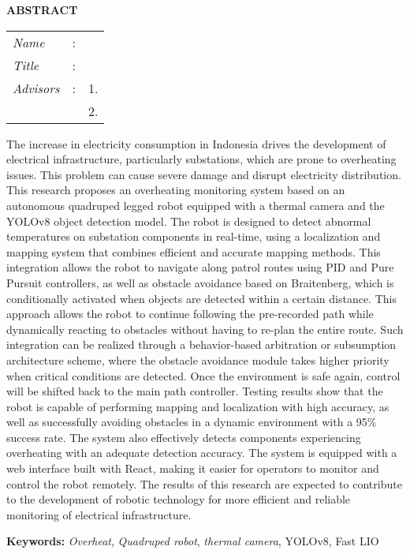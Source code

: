 \begin{center}
  \large\textbf{ABSTRACT}
\end{center}


\vspace{2ex}

\begingroup
\setlength{\tabcolsep}{0pt}

\noindent
\begin{tabularx}{\textwidth}{l >{\centering}m{3em} X}
  \emph{Name}     & : & \name{}         \\

  \emph{Title}    & : & \engtatitle{}   \\

  \emph{Advisors} & : & 1. \advisor{}   \\
                  &   & 2. \coadvisor{} \\
\end{tabularx}
\endgroup

The increase in electricity consumption in Indonesia drives the development of electrical infrastructure, particularly substations, which are prone to overheating issues. This problem can cause severe damage and disrupt electricity distribution. This research proposes an overheating monitoring system based on an autonomous quadruped legged robot equipped with a thermal camera and the YOLOv8 object detection model. The robot is designed to detect abnormal temperatures on substation components in real-time, using a localization and mapping system that combines efficient and accurate mapping methods. This integration allows the robot to navigate along patrol routes using PID and Pure Pursuit controllers, as well as obstacle avoidance based on Braitenberg, which is conditionally activated when objects are detected within a certain distance. This approach allows the robot to continue following the pre-recorded path while dynamically reacting to obstacles without having to re-plan the entire route. Such integration can be realized through a behavior-based arbitration or subsumption architecture scheme, where the obstacle avoidance module takes higher priority when critical conditions are detected. Once the environment is safe again, control will be shifted back to the main path controller. Testing results show that the robot is capable of performing mapping and localization with high accuracy, as well as successfully avoiding obstacles in a dynamic environment with a 95\% success rate. The system also effectively detects components experiencing overheating with an adequate detection accuracy. The system is equipped with a web interface built with React, making it easier for operators to monitor and control the robot remotely. The results of this research are expected to contribute to the development of robotic technology for more efficient and reliable monitoring of electrical infrastructure.

\vspace{2ex}
\noindent
\textbf{Keywords:} \emph{Overheat}, \emph{Quadruped robot}, \emph{thermal camera}, YOLOv8, Fast LIO